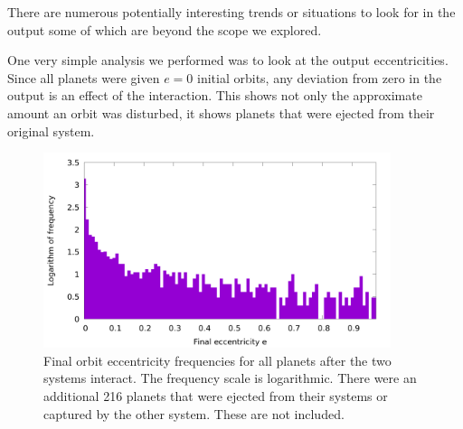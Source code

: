 \documentclass[12pt]{article}
\begin{document}
    There are numerous potentially interesting trends or situations to look for in
    the output some of which are beyond the scope we explored. 
    
    One very simple analysis we performed was to look at the output
    eccentricities. Since all planets were given $e=0$ initial orbits, any deviation
    from zero in the output is an effect of the interaction. This shows not only the
    approximate amount an orbit was disturbed, it shows planets that were ejected
    from their original system.


    \begin{figure}[H]
        \centering
        \caption{Final orbit eccentricity frequencies for all planets 
            after the two systems interact. The frequency scale is logarithmic.
            There were an additional 216 planets that were ejected from their
            systems or captured by the other system. These are not included.}
        \includegraphics[width=4in]{eccentricity_final}
    \end{figure}
\end{document}
